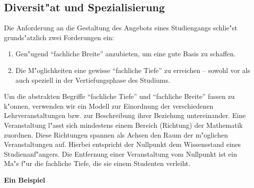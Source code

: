 \newpage
\subsection{Diversit"at und Spezialisierung}

Die Anforderung an die Gestaltung des Angebots eines Studiengangs schlie"st grunds"atzlich zwei Forderungen ein: 
\begin{enumerate}
	\item Gen"ugend "`fachliche Breite"' anzubieten, um eine gute Basis zu schaffen.
	\item Die M"oglichkeiten eine gewisse "`fachliche Tiefe"' zu erreichen -- sowohl vor als auch speziell in der Vertiefungsphase des Studiums.
\end{enumerate}

Um die abstrakten Begriffe "`fachliche Tiefe"' und "`fachliche
Breite"' fassen zu k"onnen, verwenden wir ein Modell zur Einordnung
der verschiedenen Lehrveranstaltungen bzw. zur Beschreibung ihrer
Beziehung untereinander.  Eine Veranstaltung l"asst sich mindestens
einem Bereich (Richtung) der Mathematik zuordnen. Diese Richtungen
spannen als Achsen den Raum der m"oglichen Veranstaltungen auf.
Hierbei entspricht der Nullpunkt dem Wissensstand eines Studienanf"angers.
Die Entfernung einer Veranstaltung vom Nullpunkt ist ein Ma"s f"ur
die fachliche Tiefe, die sie einem Studenten verleiht.

\begin{center}
\textbf{Ein Beispiel}\\
\end{center}

